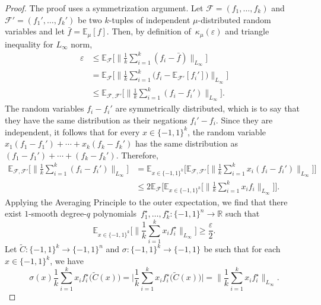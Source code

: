 \documentclass[11pt]{article}
\numberwithin{equation}{section}
\theoremstyle{definition}
\theoremstyle{plain}
\newcommand{\R}{\mathbb R}
\newcommand{\pmset}[1]{\{-1,1\}^{#1}} %
\newcommand{\sBC}{{\{-1,1\}}}
\newcommand{\Exp}{{\mathbb{E}}}
\newcommand{\E}{\mathbb{E}}
\newcommand{\eps}{\varepsilon}
\newcommand{\beq}{\begin{equation}}
\newcommand{\eeq}{\end{equation}}
\begin{document}
\begin{proof}
The proof uses a symmetrization argument.
Let $\mathcal F = (f_1,\dots,f_k)$ and $\mathcal F' = (f_1',\dots,f_k')$ be two $k$-tuples of independent $\mu$-distributed random variables and let $\bar f = \Exp_\mu[f]$.
Then, by definition of~$\kappa_\mu(\eps)$ and triangle inequality for $L_\infty$ norm,
\begin{align*}
\eps 
&\le 
\E_{\mathcal F}\Big[\Big\|\frac{1}{k}\sum_{i=1}^k (f_i - \bar f)\Big\|_{L_\infty}\Big]\\
&=
\E_{\mathcal F}\Big[\Big\|\frac{1}{k}\sum_{i=1}^k \big(f_i - \Exp_{\mathcal F'}[f_i']\big)\Big\|_{L_\infty}\Big]\\
&\le 
\E_{\mathcal{F,F'}}\Big[\Big\|\frac{1}{k}\sum_{i=1}^k (f_i - f_i')\Big\|_{L_{\infty}}\Big].
\end{align*}
The random variables $f_i - f_i'$ are symmetrically distributed, which is to say that they have the same distribution as their negations $f_i' - f_i$.
Since they are independent, it follows that
for every $x\in\pmset{k}$, the random variable $x_1(f_1 - f_1') + \cdots + x_k(f_k - f_k')$ has the same distribution as $(f_1 - f_1') + \cdots + (f_k - f_k')$.
Therefore,
\begin{align*}
\E_{\mathcal{F,F'}}\Big[\Big\|\frac{1}{k}\sum_{i=1}^k (f_i - f_i')\Big\|_{L_{\infty}}\Big]
&= 
\E_{x\in \sBC^k}\Big[\E_{\mathcal{F,F'}}\Big[\Big\|\frac{1}{k}\sum_{i=1}^k x_i(f_i - f_i')\Big\|_{L_{\infty}}\Big]\Big]\\
&\le
2\E_{\mathcal{F}}\Big[\E_{x\in \sBC^k}\Big[\Big\|\frac{1}{k}\sum_{i=1}^k x_if_i\Big\|_{L_{\infty}}\Big]\Big].
\end{align*}
Applying the Averaging Principle to the outer expectation, we find that there exist $1$-smooth degree-$q$ polynomials~$f_1^\star,\dots,f_k^\star:\pmset{n}\to\R$ such that 
\beq\label{eq:fstareps}
\E_{x\in \sBC^k}\Big[\Big\|\frac{1}{k}\sum_{i=1}^k x_if_i^\star\Big\|_{L_\infty}\Big]
\ge \frac{\eps}{2}.
\eeq
Let $\tilde C:\sBC^k\to \sBC^n$ and $\sigma:\pmset{k}\to\pmset{}$ be such that for each $x\in\pmset{k}$, we have
\beq\label{eq:Cdef}
\sigma(x)\frac{1}{k}\sum_{i=1}^k x_if_i^\star\big(\tilde C(x)\big)
=
\Big|
\frac{1}{k}\sum_{i=1}^k x_if_i^\star\big(\tilde C(x)\big)
\Big|
=
\Big\|\frac{1}{k}\sum_{i=1}^k x_if_i^\star\Big\|_{L_{\infty}}.
\eeq


\end{proof}
\end{document}
